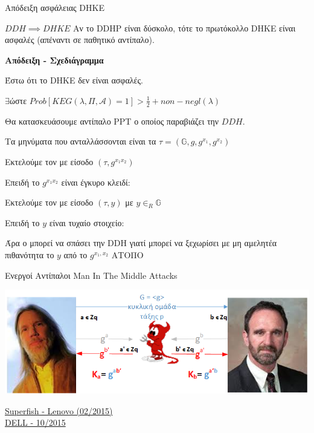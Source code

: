 \documentclass[handout]{beamer}
\begin{document}
\begin{frame}{Απόδειξη ασφάλειας DHKE}
\begin{block}{$DDH \implies DHKE$}
Αν το DDHP είναι δύσκολο, τότε το πρωτόκολλο DHKE είναι ασφαλές (απέναντι σε παθητικό αντίπαλο).
\end{block}

\pause

\textbf{Απόδειξη - Σχεδιάγραμμα}
\begin{small}
Έστω ότι το DHKE δεν είναι ασφαλές. 

$\exists$\adv ώστε \alert{$Prob[KEG(\lambda,\Pi,\mathcal{A})=1] > \frac{1}{2}+non-negl(\lambda)$}

Θα κατασκευάσουμε αντίπαλο PPT \advb ο οποίος παραβιάζει την $DDH$.
\pause

Τα μηνύματα που ανταλλάσσονται είναι τα  $\tau= (\mathbb{G},g,g^{x_1},g^{x_2})$

Εκτελούμε τον \adv με είσοδο $(\tau,g^{x_1x_2})$
\pause

Επειδή το $g^{x_1x_2}$ είναι έγκυρο κλειδί:

\pause

Εκτελούμε τον  \adv με είσοδο  $(\tau,y)$ με $y \in_R \mathbb{G}$

Επειδή το $y$ είναι τυχαίο στοιχείο:

\pause

Άρα ο \advb μπορεί να σπάσει την DDH γιατί μπορεί να ξεχωρίσει με μη αμελητέα πιθανότητα το $y$ από το $g^{x_1,x_2}$ \pause \alert{ΑΤΟΠΟ}
\end{small}
\end{frame}

\begin{frame}{Ενεργοί Αντίπαλοι}
\alert{Man In The Middle Attacks}
\begin{center}
\includegraphics[scale=0.6]{dh-mitm.png}
\end{center} 
\pause
\alert{\href{https://www.schneier.com/blog/archives/2015/02/man-in-the-midd_7.html}{Superfish - Lenovo (02/2015)}}\\
\alert{\href{http://arstechnica.com/security/2015/11/dell-apologizes-for-https-certificate-fiasco-provides-removal-tool/}{DELL - 10/2015}}
\end{frame}
\end{document}
